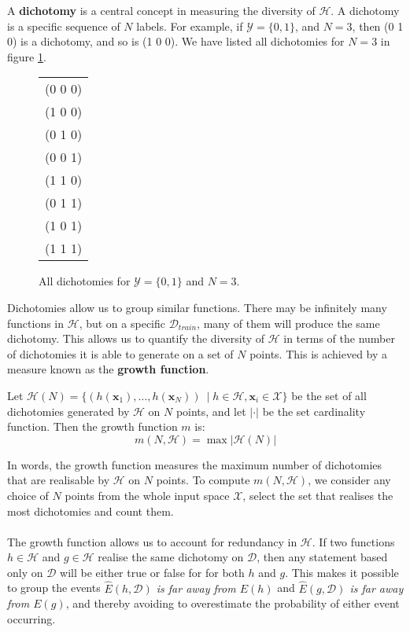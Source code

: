A \textbf{dichotomy} is a central concept in measuring the diversity of $\mathcal{H}$. A dichotomy is a specific sequence of $N$ labels. For example, if $\mathcal{Y} = \{0, 1\}$, and $N = 3$, then (0 1 0) is a dichotomy, and so is (1 0 0). We have listed all dichotomies for $N = 3$ in figure \ref{dichotomies}.

\begin{figure}[h]
	\begin{center}
			\begin{tabular}{c}
		(0 0 0) \\
		(1 0 0) \\
		(0 1 0) \\
		(0 0 1) \\
		(1 1 0) \\
		(0 1 1) \\
		(1 0 1) \\
		(1 1 1) \\
	\end{tabular}
	\end{center}
	\label{dichotomies}
	\caption{All dichotomies for $\mathcal{Y} = \{0, 1\}$ and $N = 3$.}
\end{figure}

Dichotomies allow us to group similar functions. There may be infinitely many functions in $\mathcal{H}$, but on a specific $\mathcal{D}_{train}$, many of them will produce the same dichotomy.
This allows us to quantify the diversity of $\mathcal{H}$ in terms of the number of dichotomies it is able to generate on a set of $N$ points. This is achieved by a measure known as the \textbf{growth function}.
\begin{definition}
	\label{growth_function}
	Let $\mathcal{H}(N) = \{(h(\mathbf{x}_1), \dots, h(\mathbf{x}_N))\ \mid h \in \mathcal{H}, \mathbf{x}_i \in \mathcal{X}\}$ be the set of all dichotomies generated by $\mathcal{H}$ on $N$ points, and let $|\cdot|$ be the set cardinality function. Then the growth function $m$ is:
	$$
		m(N, \mathcal{H}) = \max |\mathcal{H}(N)|
	$$
\end{definition}
In words, the growth function measures the maximum number of dichotomies that are realisable by $\mathcal{H}$ on $N$ points. To compute $m(N, \mathcal{H})$, we consider any choice of $N$ points from the whole input space $\mathcal{X}$, select the set that realises the most dichotomies and count them.
\\\\
The growth function allows us to account for redundancy in $\mathcal{H}$. If two functions $h \in \mathcal{H}$ and $g \in \mathcal{H}$ realise the same dichotomy on $\mathcal{D}$, then any statement based only on $\mathcal{D}$ will be either true or false for for both $h$ and $g$. This makes it possible to group the events \textit{$\hat{E}(h, \mathcal{D})$ is far away from $E(h)$} and \textit{$\hat{E}(g, \mathcal{D})$ is far away from $E(g)$}, and thereby avoiding to overestimate the probability of either event occurring.

